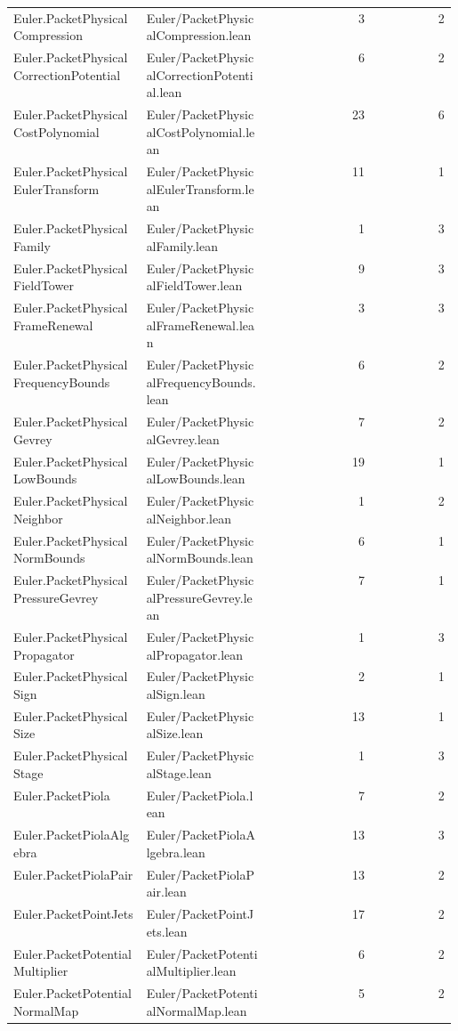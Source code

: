 \begin{longtable}{p{0.30\linewidth}p{0.28\linewidth}rr}
Euler.PacketPhysicalCompression & Euler/PacketPhysicalCompression.lean & 3 & 2\\
Euler.PacketPhysicalCorrectionPotential & Euler/PacketPhysicalCorrectionPotential.lean & 6 & 2\\
Euler.PacketPhysicalCostPolynomial & Euler/PacketPhysicalCostPolynomial.lean & 23 & 6\\
Euler.PacketPhysicalEulerTransform & Euler/PacketPhysicalEulerTransform.lean & 11 & 1\\
Euler.PacketPhysicalFamily & Euler/PacketPhysicalFamily.lean & 1 & 3\\
Euler.PacketPhysicalFieldTower & Euler/PacketPhysicalFieldTower.lean & 9 & 3\\
Euler.PacketPhysicalFrameRenewal & Euler/PacketPhysicalFrameRenewal.lean & 3 & 3\\
Euler.PacketPhysicalFrequencyBounds & Euler/PacketPhysicalFrequencyBounds.lean & 6 & 2\\
Euler.PacketPhysicalGevrey & Euler/PacketPhysicalGevrey.lean & 7 & 2\\
Euler.PacketPhysicalLowBounds & Euler/PacketPhysicalLowBounds.lean & 19 & 1\\
Euler.PacketPhysicalNeighbor & Euler/PacketPhysicalNeighbor.lean & 1 & 2\\
Euler.PacketPhysicalNormBounds & Euler/PacketPhysicalNormBounds.lean & 6 & 1\\
Euler.PacketPhysicalPressureGevrey & Euler/PacketPhysicalPressureGevrey.lean & 7 & 1\\
Euler.PacketPhysicalPropagator & Euler/PacketPhysicalPropagator.lean & 1 & 3\\
Euler.PacketPhysicalSign & Euler/PacketPhysicalSign.lean & 2 & 1\\
Euler.PacketPhysicalSize & Euler/PacketPhysicalSize.lean & 13 & 1\\
Euler.PacketPhysicalStage & Euler/PacketPhysicalStage.lean & 1 & 3\\
Euler.PacketPiola & Euler/PacketPiola.lean & 7 & 2\\
Euler.PacketPiolaAlgebra & Euler/PacketPiolaAlgebra.lean & 13 & 3\\
Euler.PacketPiolaPair & Euler/PacketPiolaPair.lean & 13 & 2\\
Euler.PacketPointJets & Euler/PacketPointJets.lean & 17 & 2\\
Euler.PacketPotentialMultiplier & Euler/PacketPotentialMultiplier.lean & 6 & 2\\
Euler.PacketPotentialNormalMap & Euler/PacketPotentialNormalMap.lean & 5 & 2\\

\end{longtable}
